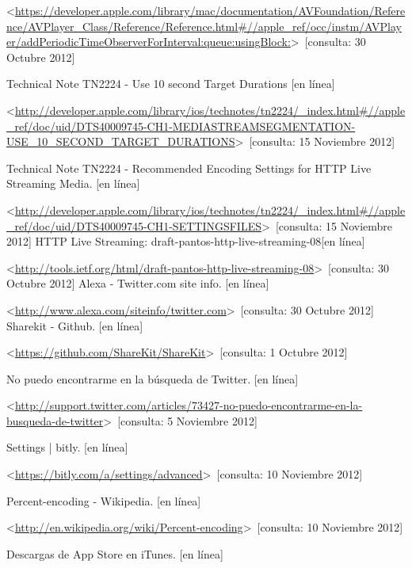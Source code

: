 \begin{thebibliography}{99}
\begin{sloppypar}
\textless \url{https://developer.apple.com/library/mac/documentation/AVFoundation/Reference/AVPlayer_Class/Reference/Reference.html\#//apple_ref/occ/instm/AVPlayer/addPeriodicTimeObserverForInterval:queue:usingBlock:}\textgreater \ [consulta: 30 Octubre 2012]


Technical Note TN2224 - Use 10 second Target Durations [en línea]\

\textless \url{http://developer.apple.com/library/ios/technotes/tn2224/_index.html\#//apple_ref/doc/uid/DTS40009745-CH1-MEDIASTREAMSEGMENTATION-USE_10_SECOND_TARGET_DURATIONS}\textgreater \ [consulta: 15 Noviembre 2012]

Technical Note TN2224 - Recommended Encoding Settings for HTTP Live Streaming Media. [en línea]\

\textless \url{http://developer.apple.com/library/ios/technotes/tn2224/_index.html\#//apple_ref/doc/uid/DTS40009745-CH1-SETTINGSFILES}\textgreater \ [consulta: 15 Noviembre 2012]
HTTP Live Streaming: draft-pantos-http-live-streaming-08[en línea]\

\textless \url{http://tools.ietf.org/html/draft-pantos-http-live-streaming-08}\textgreater \ [consulta: 30 Octubre 2012]
%
Alexa - Twitter.com site info. [en línea]\

\textless \url{http://www.alexa.com/siteinfo/twitter.com}\textgreater \ [consulta: 30 Octubre 2012] 
%
Sharekit - Github. [en línea]\

\textless \url{https://github.com/ShareKit/ShareKit}\textgreater \ [consulta: 1 Octubre 2012] 

%
No puedo encontrarme en la búsqueda de Twitter. [en línea]

\textless \url{http://support.twitter.com/articles/73427-no-puedo-encontrarme-en-la-busqueda-de-twitter}\textgreater \ [consulta: 5 Noviembre 2012] 

%
Settings | bitly. [en línea]\

\textless \url{https://bitly.com/a/settings/advanced}\textgreater \ [consulta: 10 Noviembre 2012] 

%
Percent-encoding - Wikipedia. [en línea]\

\textless \url{http://en.wikipedia.org/wiki/Percent-encoding}\textgreater \ [consulta: 10 Noviembre 2012] 

%
Descargas de App Store en iTunes. [en línea]\


\end{sloppypar}
\end{thebibliography}
